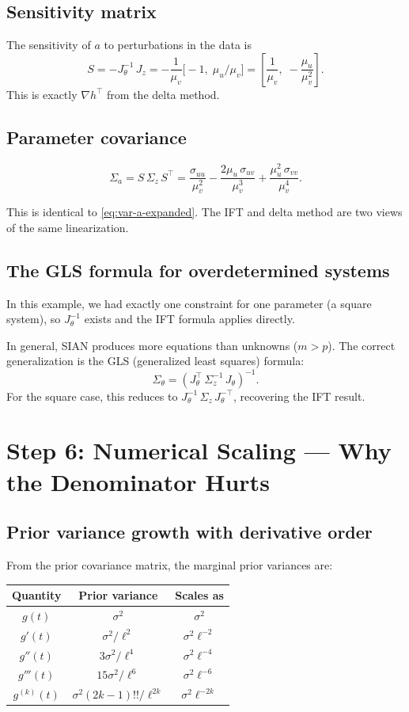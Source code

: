 \documentclass[11pt]{article}
\begin{document}
\subsection{Sensitivity matrix}

The sensitivity of $a$ to perturbations in the data is
\[
S = -J_\theta^{-1}\, J_z = -\frac{1}{\mu_v}\bigl[-1,\; \mu_u/\mu_v\bigr] = \left[\frac{1}{\mu_v},\; -\frac{\mu_u}{\mu_v^2}\right].
\]
This is exactly $\nabla h^\top$ from the delta method.

\subsection{Parameter covariance}

\[
\Sigma_a = S\, \Sigma_z\, S^\top
= \frac{\sigma_{uu}}{\mu_v^2}
- \frac{2\mu_u\,\sigma_{uv}}{\mu_v^3}
+ \frac{\mu_u^2\,\sigma_{vv}}{\mu_v^4}.
\]

This is identical to \eqref{eq:var-a-expanded}. The IFT and delta method are two views of the same linearization.

\subsection{The GLS formula for overdetermined systems}

In this example, we had exactly one constraint for one parameter (a square system), so $J_\theta^{-1}$ exists and the IFT formula applies directly.

In general, SIAN produces more equations than unknowns ($m > p$). The correct generalization is the GLS (generalized least squares) formula:
\[
\Sigma_\theta = \left(J_\theta^\top\, \Sigma_z^{-1}\, J_\theta\right)^{-1}.
\]
For the square case, this reduces to $J_\theta^{-1}\, \Sigma_z\, J_\theta^{-\top}$, recovering the IFT result.

\section{Step 6: Numerical Scaling --- Why the Denominator Hurts}

\subsection{Prior variance growth with derivative order}

From the prior covariance matrix, the marginal prior variances are:
\begin{center}
\begin{tabular}{ccc}
\toprule
Quantity & Prior variance & Scales as \\
\midrule
$g(t)$ & $\sigma^2$ & $\sigma^2$ \\
$g'(t)$ & $\sigma^2/\ell^2$ & $\sigma^2 \ell^{-2}$ \\
$g''(t)$ & $3\sigma^2/\ell^4$ & $\sigma^2 \ell^{-4}$ \\
$g'''(t)$ & $15\sigma^2/\ell^6$ & $\sigma^2 \ell^{-6}$ \\
$g^{(k)}(t)$ & $\sigma^2 (2k{-}1)!!/\ell^{2k}$ & $\sigma^2 \ell^{-2k}$ \\
\bottomrule
\end{tabular}
\end{center}
\end{document}
